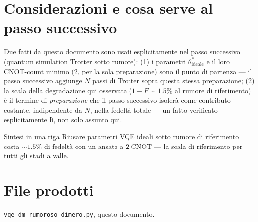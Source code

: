 \documentclass[11pt,a4paper]{article}
\begin{document}
\section{Considerazioni e cosa serve al passo successivo}

Due fatti da questo documento sono usati esplicitamente nel passo
successivo (quantum simulation Trotter sotto rumore): (1) i parametri
$\theta^*_\text{ideale}$ e il loro CNOT-count minimo (2, per la sola
preparazione) sono il punto di partenza --- il passo successivo aggiunge
$N$ passi di Trotter sopra questa stessa preparazione; (2) la scala della
degradazione qui osservata ($1-F\sim1.5\%$ al rumore di riferimento) è
il termine di \emph{preparazione} che il passo successivo isolerà come
contributo costante, indipendente da $N$, nella fedeltà totale --- un
fatto verificato esplicitamente lì, non solo assunto qui.

\begin{okbox}{Sintesi in una riga}
Riusare parametri VQE ideali sotto rumore di riferimento costa
$\sim1.5\%$ di fedeltà con un ansatz a 2 CNOT --- la scala di riferimento
per tutti gli stadi a valle.
\end{okbox}

\section*{File prodotti}

\texttt{vqe\_dm\_rumoroso\_dimero.py}, questo documento.
\end{document}
